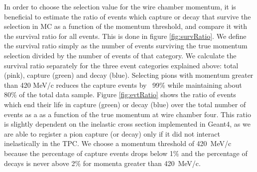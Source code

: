 In order to choose the selection value for the wire chamber momentum, it is beneficial to estimate the ratio of events which capture or decay that survive the selection in MC as a function of the momentum threshold, and compare it with the survival ratio for all events. This is done in figure \ref{fig:survRatio}. We define the survival ratio simply  as the number of events surviving the true momentum selection divided by the number of events of that category. We calculate the survival ratio separately for the three event categories explained above: total (pink), capture (green) and decay (blue).
Selecting pions with momentum greater than 420 MeV/c reduces the capture events by ~99\% while maintaining about 80\% of the total data sample. 
Figure \ref{fig:evtRatio} shows the ratio of events which end their life in capture (green) or decay (blue) over the total number of events as a as a function of the true momentum at wire chamber four. This ratio is slightly dependent on the inelastic cross section implemented in Geant4, as we are able to register a pion capture (or decay) only if it did not interact inelastically in the TPC. We choose a momentum threshold of 420~MeV/c because the percentage of capture events drops below 1\% and the percentage of decays is never above 2\% for momenta greater than 420~MeV/c.

